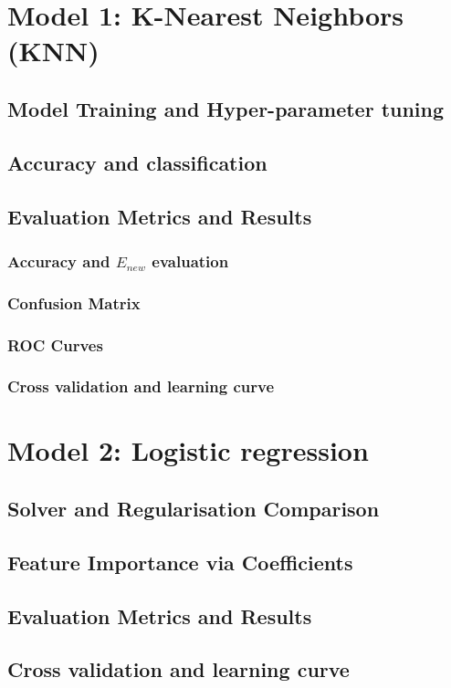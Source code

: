 \documentclass[10pt,twocolumn]{article}
\begin{document}
\section{Model 1: K-Nearest Neighbors (KNN)}
\subsection{Model Training and Hyper-parameter tuning}

\subsection{Accuracy and classification}
\subsection{Evaluation Metrics and Results}
\subsubsection{Accuracy and $E_{new}$ evaluation}
\subsubsection{Confusion Matrix}
\subsubsection{ROC Curves}
\subsubsection{Cross validation and learning curve}

\section{Model 2: Logistic regression}
\subsection{Solver and Regularisation Comparison}
\subsection{Feature Importance via Coefficients}
\subsection{Evaluation Metrics and Results}
\subsection{Cross validation and learning curve}
\end{document}
